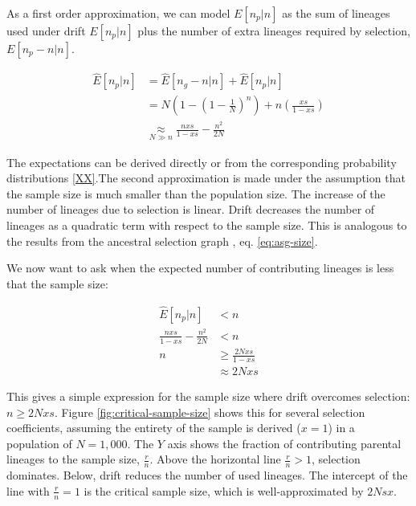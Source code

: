 \documentclass[review]{elsarticle}
\begin{document}
As a first order approximation, we can model $E[n_p | n]$ as the sum of lineages used under drift
$E[n_p | n]$ plus the number of extra lineages required by selection, $E[n_p - n | n]$.

\begin{equation*}
  \begin{aligned}
    \hat{E}[n_p  | n] &= \hat{E}[n_g-n | n] + \hat{E}[n_p | n] \\
    &= N(1-\left( 1 - \frac{1}{N} \right)^n) + n\left( \frac{xs}{1-xs}\right) \\
    &\underset{N\gg n}{\approx} \frac{nxs}{1-xs} - \frac{n^2}{2N}
  \end{aligned}
\end{equation*}

The expectations can be derived directly or from the corresponding probability distributions
\eqref{XX}.The second approximation is made under the assumption that the sample size is much
smaller than the population size. The increase of the number of lineages due to selection is linear.
Drift decreases the number of lineages as a quadratic term with respect to the sample size. This is
analogous to the results from the ancestral selection graph \citep{KroneNeuhauser1997}, eq.
\eqref{eq:asg-size}.

We now want to ask when the expected number of contributing lineages is less that the sample size:

\begin{equation*}
  \begin{aligned}
    \label{eq:critical-sample}
    \hat{E}[n_p | n] &< n \\
    \frac{nxs}{1-xs} - \frac{n^2}{2N} &< n \\
    n &\ge \frac{2Nxs}{1-xs} \\
                                       &\approx 2Nxs
  \end{aligned}
\end{equation*}

This gives a simple expression for the sample size where drift overcomes selection: $n \ge 2Nxs$.
Figure \ref{fig:critical-sample-size} shows this for several selection coefficients, assuming the
entirety of the sample is derived ($x=1$) in a population of $N=1,000$. The $Y$ axis shows the fraction of
contributing parental lineages to the sample size, $\frac{r}{n}$. Above the horizontal line
$\frac{r}{n} > 1$, selection dominates. Below, drift reduces the number of used lineages. The
intercept of the line with $\frac{r}{n} = 1$ is the critical sample size, which is well-approximated
by $2Nsx$.
\end{document}
